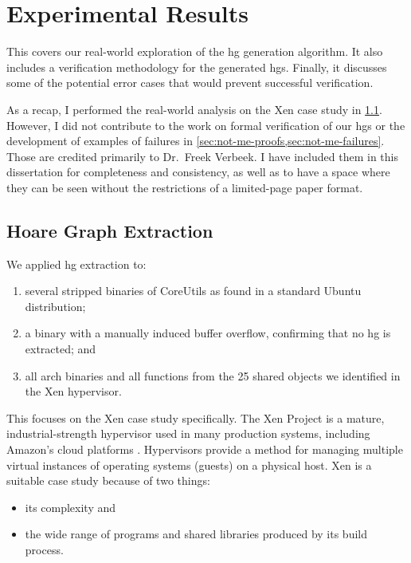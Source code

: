 \chapter{Experimental Results}\label{ch:hg-results}
This  covers our real-world exploration of the \ac{hg} generation algorithm.
It also includes a verification methodology for the generated \acp{hg}.
Finally, it discusses some of the potential error cases that would prevent successful verification.

As a recap, I performed the real-world analysis on the Xen case study in \cref{hg-extraction}.
However, I did not contribute to the work on formal verification of our \acp{hg} or the development of examples of failures in \cref{sec:not-me-proofs,sec:not-me-failures}.
Those  are credited primarily to Dr.~Freek Verbeek.
I have included them in this dissertation for completeness and consistency, as well as to have a space where they can be seen without the restrictions of a limited-page paper format.

\section{Hoare Graph Extraction}\label{hg-extraction}
We applied \ac{hg} extraction to:
\begin{enumerate}
  \item several stripped binaries of CoreUtils as found in a standard Ubuntu distribution;
  \item a binary with a manually induced buffer overflow, confirming that no \ac{hg} is extracted; and
  \item all  \gls{arch} binaries and all  functions from the 25 shared objects we identified in the Xen hypervisor.
\end{enumerate}
This  focuses on the Xen case study specifically.
The Xen Project is a mature, industrial-strength hypervisor used in many production systems, including Amazon's cloud platforms \autocite{chisnall2008definitive}.
Hypervisors provide a method for managing multiple virtual instances of operating systems (guests) on a physical host.
Xen is a suitable case study because of two things:
\begin{itemize}
  \item its complexity and
  \item the wide range of programs and shared libraries produced by its build process.
\end{itemize}

